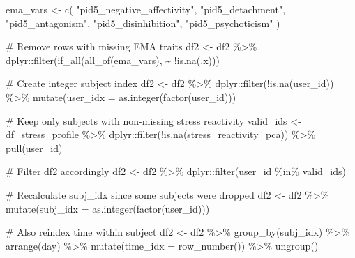 \documentclass[
  11pt,
  a4paper,
  onecolumn]{article}
\newenvironment{Shaded}{}{}
\newcommand{\AttributeTok}[1]{\textcolor[rgb]{0.84,0.23,0.29}{#1}}
\newcommand{\CommentTok}[1]{\textcolor[rgb]{0.42,0.45,0.49}{#1}}
\newcommand{\FunctionTok}[1]{\textcolor[rgb]{0.44,0.26,0.76}{#1}}
\newcommand{\NormalTok}[1]{\textcolor[rgb]{0.14,0.16,0.18}{#1}}
\newcommand{\OtherTok}[1]{\textcolor[rgb]{0.44,0.26,0.76}{#1}}
\newcommand{\SpecialCharTok}[1]{\textcolor[rgb]{0.00,0.36,0.77}{#1}}
\newcommand{\StringTok}[1]{\textcolor[rgb]{0.01,0.18,0.38}{#1}}
\begin{document}
\begin{Shaded}
\begin{Highlighting}[]
\NormalTok{ema\_vars }\OtherTok{\textless{}{-}} \FunctionTok{c}\NormalTok{(}
  \StringTok{"pid5\_negative\_affectivity"}\NormalTok{,}
  \StringTok{"pid5\_detachment"}\NormalTok{,}
  \StringTok{"pid5\_antagonism"}\NormalTok{,}
  \StringTok{"pid5\_disinhibition"}\NormalTok{,}
  \StringTok{"pid5\_psychoticism"}
\NormalTok{)}

\CommentTok{\# Remove rows with missing EMA traits}
\NormalTok{df2 }\OtherTok{\textless{}{-}}\NormalTok{ df2 }\SpecialCharTok{\%\textgreater{}\%} 
\NormalTok{  dplyr}\SpecialCharTok{::}\FunctionTok{filter}\NormalTok{(}\FunctionTok{if\_all}\NormalTok{(}\FunctionTok{all\_of}\NormalTok{(ema\_vars), }\SpecialCharTok{\textasciitilde{}} \SpecialCharTok{!}\FunctionTok{is.na}\NormalTok{(.x)))}

\CommentTok{\# Create integer subject index}
\NormalTok{df2 }\OtherTok{\textless{}{-}}\NormalTok{ df2 }\SpecialCharTok{\%\textgreater{}\%}
\NormalTok{  dplyr}\SpecialCharTok{::}\FunctionTok{filter}\NormalTok{(}\SpecialCharTok{!}\FunctionTok{is.na}\NormalTok{(user\_id)) }\SpecialCharTok{\%\textgreater{}\%}
  \FunctionTok{mutate}\NormalTok{(}\AttributeTok{user\_idx =} \FunctionTok{as.integer}\NormalTok{(}\FunctionTok{factor}\NormalTok{(user\_id)))}

\CommentTok{\# Keep only subjects with non{-}missing stress reactivity}
\NormalTok{valid\_ids }\OtherTok{\textless{}{-}}\NormalTok{ df\_stress\_profile }\SpecialCharTok{\%\textgreater{}\%}
\NormalTok{  dplyr}\SpecialCharTok{::}\FunctionTok{filter}\NormalTok{(}\SpecialCharTok{!}\FunctionTok{is.na}\NormalTok{(stress\_reactivity\_pca)) }\SpecialCharTok{\%\textgreater{}\%}
  \FunctionTok{pull}\NormalTok{(user\_id)}

\CommentTok{\# Filter df2 accordingly}
\NormalTok{df2 }\OtherTok{\textless{}{-}}\NormalTok{ df2 }\SpecialCharTok{\%\textgreater{}\%} 
\NormalTok{  dplyr}\SpecialCharTok{::}\FunctionTok{filter}\NormalTok{(user\_id }\SpecialCharTok{\%in\%}\NormalTok{ valid\_ids)}

\CommentTok{\# Recalculate subj\_idx since some subjects were dropped}
\NormalTok{df2 }\OtherTok{\textless{}{-}}\NormalTok{ df2 }\SpecialCharTok{\%\textgreater{}\%}
  \FunctionTok{mutate}\NormalTok{(}\AttributeTok{subj\_idx =} \FunctionTok{as.integer}\NormalTok{(}\FunctionTok{factor}\NormalTok{(user\_id)))}

\CommentTok{\# Also reindex time within subject}
\NormalTok{df2 }\OtherTok{\textless{}{-}}\NormalTok{ df2 }\SpecialCharTok{\%\textgreater{}\%}
  \FunctionTok{group\_by}\NormalTok{(subj\_idx) }\SpecialCharTok{\%\textgreater{}\%}
  \FunctionTok{arrange}\NormalTok{(day) }\SpecialCharTok{\%\textgreater{}\%}
  \FunctionTok{mutate}\NormalTok{(}\AttributeTok{time\_idx =} \FunctionTok{row\_number}\NormalTok{()) }\SpecialCharTok{\%\textgreater{}\%}
  \FunctionTok{ungroup}\NormalTok{()}


\end{Highlighting}
\end{Shaded}
\end{document}
